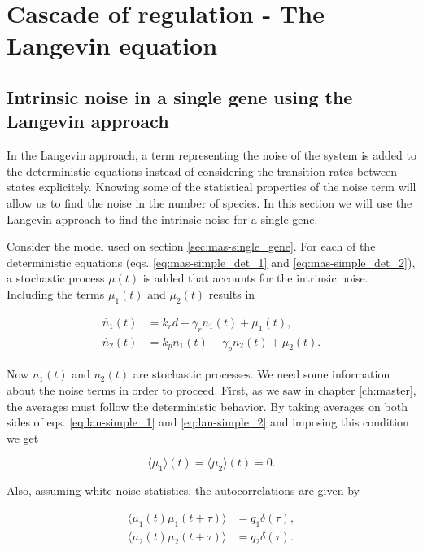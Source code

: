 \chapter{Cascade of regulation - The Langevin equation}

\section{Intrinsic noise in a single gene using the Langevin approach}
\label{sec:lan-single}
In the Langevin approach, a term representing the noise of the system is added to the deterministic equations instead of considering the transition rates between states explicitely. Knowing some of the statistical properties of the noise term will allow us to find the noise in the number of species. In this section we will use the Langevin approach to find the intrinsic noise for a single gene.

Consider the model used on section \ref{sec:mas-single_gene}. For each of the deterministic equations (eqs. \eqref{eq:mas-simple_det_1} and \eqref{eq:mas-simple_det_2}), a stochastic process $\mu(t)$ is added that accounts for the intrinsic noise. Including the terms $\mu_1(t)$ and $\mu_2(t)$ results in

\begin{align}
  \dot{n_1}(t) &= k_rd-\gamma_rn_1(t) + \mu_1(t)\label{eq:lan-simple_1},\\
  \dot{n_2}(t) &= k_pn_1(t)-\gamma_pn_2(t) + \mu_2(t)\label{eq:lan-simple_2}.
\end{align}

Now $n_1(t)$ and $n_2(t)$ are stochastic processes. We need some information about the noise terms in order to proceed. First, as we saw in chapter \ref{ch:master}, the averages must follow the deterministic behavior. By taking averages on both sides of eqs. \eqref{eq:lan-simple_1} and \eqref{eq:lan-simple_2} and imposing this condition we get

\begin{equation*}
  \langle\mu_1\rangle(t) = \langle\mu_2\rangle(t) = 0.
\end{equation*}

Also, assuming white noise statistics, the autocorrelations are given by

\begin{align}
  \langle\mu_1(t)\mu_1(t+\tau)\rangle &= q_1\delta(\tau),\label{eq:lan-simple_cor1} \\
  \langle\mu_2(t)\mu_2(t+\tau)\rangle &= q_2\delta(\tau). \label{eq:lan-simple_cor2}
\end{align}


